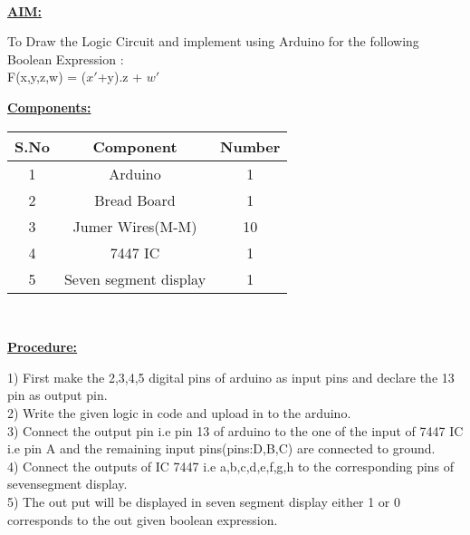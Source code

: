 \documentclass[10pt,a4paper,twocolumn]{report}
\begin{document}
\vspace{5mm}
\\ \raggedright \textbf{\underline{AIM:}}\vspace{2mm}
\\ \raggedright To Draw the Logic Circuit and implement using Arduino for the following Boolean Expression :
\\ F(x,y,z,w) = ($x'$+y).z + $w'$
\vspace{5mm}
\\ \raggedright \textbf{\underline{Components:}}\vspace{2mm}
\begin{table}[ht]
\centering %
\begin{tabular}{c c c} %
\hline\hline %
S.No & Component & Number \\ [0.5ex] %
\hline
1 & Arduino & 1 \\
2 & Bread Board & 1 \\
3 & Jumer Wires(M-M) & 10 \\
4 & 7447 IC & 1 \\
5 & Seven segment display & 1 \\ [1ex] 
\hline
\end{tabular}
\end{table}
\vspace{5mm}
\\ \raggedright \textbf{\underline{Procedure:}}\vspace{4mm}
\\ \raggedright 1) First make the 2,3,4,5 digital pins of arduino as input pins and declare                                the 13 pin as output pin.
\vspace{1mm}
\\ 2) Write the given logic in code and upload in to the arduino.
\vspace{1mm}
\\ 3) Connect the output pin i.e pin 13 of arduino to the one of the input of 7447 IC i.e pin A and the remaining input pins(pins:D,B,C) are connected to ground.
\vspace{1mm}
\\ 4) Connect the outputs of IC 7447 i.e a,b,c,d,e,f,g,h to the corresponding pins of sevensegment display.
\vspace{1mm}
\\ 5) The out put will be displayed in seven segment display either 1 or 0 corresponds to the out given boolean expression.
\vspace{10mm}
\end{document}
